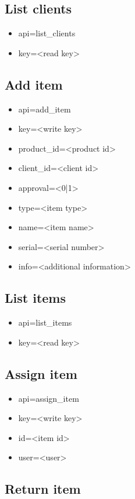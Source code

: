 \documentclass[11pt]{article}
\begin{document}
\subsection{List clients}

\begin{itemize}
\item api=list\_clients
\item key=<read key>
\end{itemize}

\subsection{Add item}

\begin{itemize}
\item api=add\_item
\item key=<write key>
\item product\_id=<product id>
\item client\_id=<client id>
\item approval=<0|1>
\item type=<item type>
\item name=<item name>
\item serial=<serial number>
\item info=<additional information>
\end{itemize}

\subsection{List items}

\begin{itemize}
\item api=list\_items
\item key=<read key>
\end{itemize}

\subsection{Assign item}

\begin{itemize}
\item api=assign\_item
\item key=<write key>
\item id=<item id>
\item user=<user>
\end{itemize}

\subsection{Return item}
\end{document}
